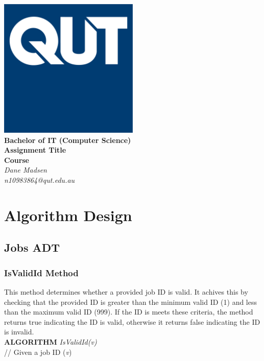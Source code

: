 \documentclass[12pt,a4paper]{article}
\begin{document}
	\begin{titlepage}
		
		\begin{center}
			\includegraphics[width=0.5\textwidth]{QUT.jpg}\\
			[0.03\textheight]  
			\Large\textbf{Bachelor of IT (Computer Science)}\\
			\Large\textbf{Assignment Title}\\
			\large\textbf{Course}\\
			[0.02\textheight]
			\large\textsl{Dane Madsen}\\
			\large\textsl{n10983864@qut.edu.au}
		\end{center}
		
	\end{titlepage}
	\tableofcontents
	\newpage
	
	\section{Algorithm Design}
		\subsection{Jobs ADT}
			\subsubsection{IsValidId Method}
				This method determines whether a provided job ID is valid. It achives this 
				by checking that the provided ID is greater than the minimum valid ID (1) and 
				less than the maximum valid ID (999). If the ID is meets these criteria, the 
				method returns true indicating the ID is valid, otherwise it returns false 
				indicating the ID is invalid.\\
				
				\textbf{ALGORITHM} \textit{IsValidId(v)}\\
				\null\qquad// Given a job ID (\textit{v})\\
\end{document}

